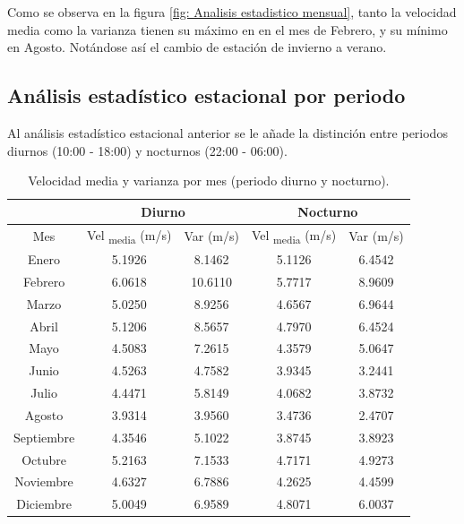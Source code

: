 \documentclass{IEEEtran}
\begin{document}
Como se observa en la figura \ref{fig: Analisis estadistico mensual}, tanto la velocidad media como la varianza tienen su máximo en en el mes de Febrero, y su mínimo en Agosto. Notándose así el cambio de estación de invierno a verano.

\subsection{Análisis estadístico estacional por periodo}
Al análisis estadístico estacional anterior se le añade la distinción entre periodos diurnos (10:00 - 18:00) y nocturnos (22:00 - 06:00).

\begin{table}[h]
    \centering
    \label{tab: Velocidad media y varianza por mes (periodo diurno y nocturno)}
    \caption{Velocidad media y varianza por mes (periodo diurno y nocturno).}
    \begin{tabular}{|c|c|c|c|c|}
        \hline
        & \multicolumn{2}{|c|}{Diurno} & \multicolumn{2}{c|}{Nocturno} \\
        \hline
        Mes & Vel \textsubscript{media} (m/s) & Var (m/s) & Vel \textsubscript{media} (m/s) & Var (m/s) \\
        \hline
        Enero & 5.1926 & 8.1462 & 5.1126 & 6.4542 \\
        Febrero & 6.0618 & 10.6110 & 5.7717 & 8.9609 \\
        Marzo & 5.0250 & 8.9256 & 4.6567 & 6.9644 \\
        Abril & 5.1206 & 8.5657 & 4.7970 & 6.4524 \\
        Mayo & 4.5083 & 7.2615 & 4.3579 & 5.0647 \\
        Junio & 4.5263 & 4.7582 & 3.9345 & 3.2441 \\
        Julio & 4.4471 & 5.8149 &  4.0682 & 3.8732 \\
        Agosto & 3.9314 & 3.9560 & 3.4736 & 2.4707 \\
        Septiembre & 4.3546 & 5.1022 & 3.8745 & 3.8923 \\
        Octubre & 5.2163 & 7.1533 & 4.7171 & 4.9273 \\
        Noviembre & 4.6327 & 6.7886 & 4.2625 & 4.4599 \\
        Diciembre & 5.0049 & 6.9589 & 4.8071 & 6.0037 \\
        \hline 
    \end{tabular}
\end{table}
\end{document}
